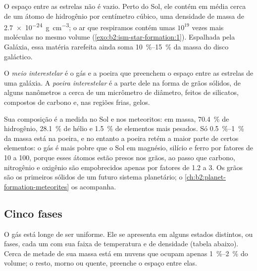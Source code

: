 O espaço entre as estrelas não é vazio. Perto do Sol, ele contém em média cerca de
um átomo de hidrogênio por centímetro cúbico, uma densidade de massa de
\qty{2.7e-24}{g.cm^{-3}}; o ar que respiramos contém umas $10^{19}$ vezes mais
moléculas no mesmo volume (\cref{exo:b2:ism-star-formation:1}). Espalhada pela Galáxia, essa matéria rarefeita
ainda soma \qtyrange{10}{15}{\percent} da massa do
disco galáctico.

\begin{definition}
\label{def:b2:ism-star-formation:ism}
O \emph{meio interestelar} é o gás e a poeira
que preenchem o espaço entre as estrelas de uma galáxia. A \emph{poeira
interestelar} é a parte dele na forma de grãos sólidos, de alguns
nanômetros a cerca de um micrômetro de diâmetro, feitos de silicatos, compostos de carbono
e, nas regiões frias, gelos.
\end{definition}

Sua composição é a medida no Sol e nos meteoritos: em massa,
\qty{70.4}{\percent} de hidrogênio, \qty{28.1}{\percent} de hélio e
\qty{1.5}{\percent} de elementos mais pesados. Só \qtyrange{0.5}{1}{\percent} da
massa está na poeira, e no entanto a poeira retém a maior parte de certos elementos: o gás é mais pobre
que o Sol em magnésio, silício e ferro por fatores de 10 a 100, porque
esses átomos estão presos nos grãos, ao passo que carbono, nitrogênio e oxigênio são
empobrecidos apenas por fatores de 1.2 a 3. Os grãos são os primeiros sólidos de um
futuro sistema planetário; o \cref{ch:b2:planet-formation-meteorites}
os acompanha.

\subsection{Cinco fases}

O gás está longe de ser uniforme. Ele se apresenta em alguns estados distintos, ou fases,
cada um com sua faixa de temperatura e de densidade (tabela abaixo). Cerca de metade
de sua massa está em nuvens que ocupam apenas \qtyrange{1}{2}{\percent} do volume;
o resto, morno ou quente, preenche o espaço entre elas.

